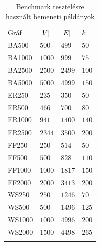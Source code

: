 \begin{table}[b]
  \centering
  \caption{Benchmark tesztelésre használt bemeneti példányok}\label{tab:BENCHMARK_INSTANCES}
  \begin{tabularx}{\textwidth} {
      >{\raggedright\arraybackslash}X
      >{\raggedleft\arraybackslash}X
      >{\raggedleft\arraybackslash}X
      >{\raggedleft\arraybackslash}X
    }
    \Xhline{4\arrayrulewidth}
    Gráf   & $\lvert V\rvert$ & $\lvert E\rvert$ & $k$   \\
    \Xhline{4\arrayrulewidth}
    BA500  & $500$     & $499$     & $50$  \\
    BA1000 & $1000$    & $999$     & $75$  \\
    BA2500 & $2500$    & $2499$    & $100$ \\
    BA5000 & $5000$    & $4999$    & $150$ \\
    \hline
    ER250  & $235$     & $350$     & $50$  \\
    ER500  & $466$     & $700$     & $80$  \\
    ER1000 & $941$     & $1400$    & $140$ \\
    ER2500 & $2344$    & $3500$    & $200$ \\
    \hline
    FF250  & $250$     & $514$     & $50$  \\
    FF500  & $500$     & $828$     & $110$ \\
    FF1000 & $1000$    & $1817$    & $150$ \\
    FF2000 & $2000$    & $3413$    & $200$ \\
    \hline
    WS250  & $250$     & $1246$    & $70$  \\
    WS500  & $500$     & $1496$    & $125$ \\
    WS1000 & $1000$    & $4996$    & $200$ \\
    WS2000 & $1500$    & $4498$    & $265$ \\
    \Xhline{4\arrayrulewidth}
  \end{tabularx}
\end{table}


